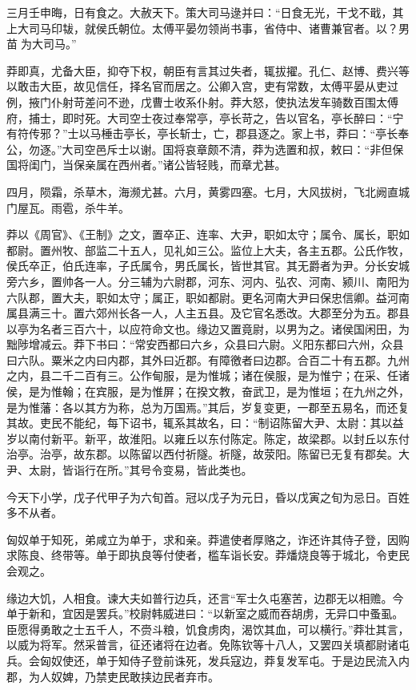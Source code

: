\documentclass[]{article}
\begin{document}
三月壬申晦，日有食之。大赦天下。策大司马逯并曰：``日食无光，干戈不戢，其上大司马印韨，就侯氏朝位。太傅平晏勿领尚书事，省侍中、诸曹兼官者。以？男苗为大司马。''

莽即真，尤备大臣，抑夺下权，朝臣有言其过失者，辄拔擢。孔仁、赵博、费兴等以敢击大臣，故见信任，择名官而居之。公卿入宫，吏有常数，太傅平晏从吏过例，掖门仆射苛差问不逊，戊曹士收系仆射。莽大怒，使执法发车骑数百围太傅府，捕士，即时死。大司空士夜过奉常亭，亭长苛之，告以官名，亭长醉曰：``宁有符传邪？''士以马棰击亭长，亭长斩士，亡，郡县逐之。家上书，莽曰：``亭长奉公，勿逐。''大司空邑斥士以谢。国将哀章颇不清，莽为选置和叔，敕曰：``非但保国将闺门，当保亲属在西州者。''诸公皆轻贱，而章尤甚。

四月，陨霜，杀草木，海濒尤甚。六月，黄雾四塞。七月，大风拔树，飞北阙直城门屋瓦。雨雹，杀牛羊。

莽以《周官》、《王制》之文，置卒正、连率、大尹，职如太守；属令、属长，职如都尉。置州牧、部监二十五人，见礼如三公。监位上大夫，各主五郡。公氏作牧，侯氏卒正，伯氏连率，子氏属令，男氏属长，皆世其官。其无爵者为尹。分长安城旁六乡，置帅各一人。分三辅为六尉郡，河东、河内、弘农、河南、颍川、南阳为六队郡，置大夫，职如太守；属正，职如都尉。更名河南大尹曰保忠信卿。益河南属县满三十。置六郊州长各一人，人主五县。及它官名悉改。大郡至分为五。郡县以亭为名者三百六十，以应符命文也。缘边又置竟尉，以男为之。诸侯国闲田，为黜陟增减云。莽下书曰：``常安西都曰六乡，众县曰六尉。义阳东都曰六州，众县曰六队。粟米之内曰内郡，其外曰近郡。有障徼者曰边郡。合百二十有五郡。九州之内，县二千二百有三。公作甸服，是为惟城；诸在侯服，是为惟宁；在采、任诸侯，是为惟翰；在宾服，是为惟屏；在揆文教，奋武卫，是为惟垣；在九州之外，是为惟藩：各以其方为称，总为万国焉。''其后，岁复变更，一郡至五易名，而还复其故。吏民不能纪，每下诏书，辄系其故名，曰：``制诏陈留大尹、太尉：其以益岁以南付新平。新平，故淮阳。以雍丘以东付陈定。陈定，故梁郡。以封丘以东付治亭。治亭，故东郡。以陈留以西付祈隧。祈隧，故荥阳。陈留已无复有郡矣。大尹、太尉，皆诣行在所。''其号令变易，皆此类也。

今天下小学，戊子代甲子为六旬首。冠以戊子为元日，昏以戊寅之旬为忌日。百姓多不从者。

匈奴单于知死，弟咸立为单于，求和亲。莽遣使者厚赂之，诈还许其侍子登，因购求陈良、终带等。单于即执良等付使者，槛车诣长安。莽燔烧良等于城北，令吏民会观之。

缘边大饥，人相食。谏大夫如普行边兵，还言``军士久屯塞苦，边郡无以相赡。今单于新和，宜因是罢兵。''校尉韩威进曰：``以新室之威而吞胡虏，无异口中蚤虱。臣愿得勇敢之士五千人，不赍斗粮，饥食虏肉，渴饮其血，可以横行。''莽壮其言，以威为将军。然采普言，征还诸将在边者。免陈钦等十八人，又罢四关填都尉诸屯兵。会匈奴使还，单于知侍子登前诛死，发兵寇边，莽复发军屯。于是边民流入内郡，为人奴婢，乃禁吏民敢挟边民者弃市。
\end{document}

